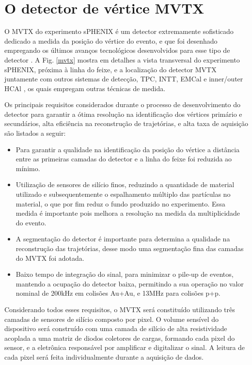 \chapter{O detector de vértice MVTX}

O MVTX do experimento sPHENIX é um detector extremamente sofisticado dedicado a medida da posição do vértice do evento, e que foi desenhado empregando os últimos avanços tecnológicos desenvolvidos para esse tipo de detector \cite{1}. A Fig. \ref{mvtx} mostra em detalhes a vista transversal do experimento sPHENIX, próxima à linha do feixe, e a localização do detector MVTX juntamente com outros sistemas de detecção, TPC, INTT, EMCal e inner/outer HCAl \cite{1}, os quais empregam outras técnicas de medida.

Os principais requisitos considerados durante o processo de 
desenvolvimento do detector para garantir a ótima resolução na identificação dos vértices primário e secundários, alta eficiência na reconstrução de trajetórias, e alta taxa de aquisição são listados a seguir:

\begin{itemize}
 
\item Para garantir a qualidade na identificação da posição do vértice a distância entre as primeiras camadas do detector e a linha do feixe foi reduzida ao mínimo.

\item Utilização de sensores de silício finos, reduzindo a quantidade de material utilizado e subsequentemente o espalhamento múltiplo das partículas no material, o que por fim reduz o fundo produzido no experimento. Essa medida é importante pois melhora a resolução na medida da multiplicidade do evento.

\item A segmentação do detector é importante para determina a qualidade na reconstrução das trajetórias, desse modo uma segmentação fina das camadas do MVTX foi adotada.

\item Baixo tempo de integração do sinal, para minimizar o pile-up de eventos, mantendo a ocupação do detector baixa, permitindo a sua operação no valor nominal de 200kHz em colisões Au+Au, e 13MHz para colisões p+p. 

\end{itemize}

Considerando todos esses requisitos, o MVTX será constituído utilizando três camadas de sensores de silício composto por pixel. O volume sensível do dispositivo será construído com uma camada de silício de alta resistividade acoplada a uma matriz de diodos coletores de cargas, formando cada pixel do sensor, e a eletrônica responsável por amplificar e digitalizar o sinal. A leitura de cada pixel será feita individualmente durante a aquisição de dados.       


